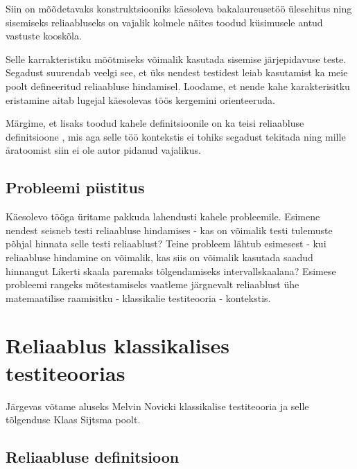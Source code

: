 \documentclass[a4paper,12pt]{article}
\numberwithin{equation}{section}
\theoremstyle{definition}
\begin{document}
Siin on mõõdetavaks konstruktsiooniks käesoleva bakalaureusetöö \"ulesehitus ning sisemiseks reliaabluseks on vajalik kolmele näites toodud k\"usimusele antud vastuste kooskõla.

Selle karrakteristiku mõõtmiseks võimalik kasutada sisemise järjepidavuse teste. Segadust suurendab veelgi see, et üks nendest testidest leiab kasutamist ka meie poolt defineeritud reliaabluse hindamisel. Loodame, et nende kahe karakterisitku eristamine aitab lugejal käesolevas töös kergemini orienteeruda.

Märgime, et lisaks toodud kahele definitsioonile on ka teisi reliaabluse definitsioone \cite{Cronbach1947}, mis aga selle töö kontekstis ei tohiks segadust tekitada ning  mille äratoomist siin ei ole autor pidanud vajalikus.


\subsection{Probleemi püstitus}

Käesolevo tööga üritame pakkuda lahendusti kahele probleemile. Esimene nendest seisneb testi reliaabluse hindamises - kas on võimalik testi tulemuste põhjal hinnata selle testi reliaablust? 
Teine probleem lähtub esimesest - kui reliaabluse hindamine on võimalik, kas siis on võimalik kasutada saadud hinnangut Likerti skaala paremaks tõlgendamiseks intervallskaalana? Esimese probleemi rangeks mõtestamiseks vaatleme järgnevalt reliaablust ühe matemaatilise raamisitku - klassikalie testiteooria - kontekstis.

\pagebreak


\section{Reliaablus klassikalises testiteoorias}
Järgevas võtame aluseks Melvin Novicki klassikalise testiteooria \cite{Novick1966a}\cite{Lord1968} ja selle tõlgenduse Klaas Sijtsma poolt. \cite[109]{Sijtsma2009}

\subsection{Reliaabluse definitsioon}
\end{document}
